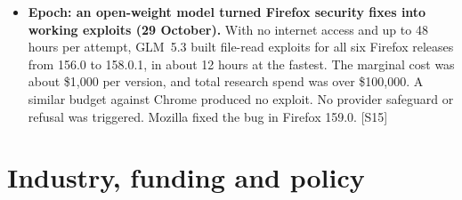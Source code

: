 \documentclass[11pt,a4paper]{article}
\newcommand{\srcref}[1]{\textcolor{brandaccent}{[S#1]}}
\begin{document}
\begin{itemize}
  \item \textbf{Epoch: an open-weight model turned Firefox security fixes into working exploits (29 October).} With no internet access and up to 48 hours per attempt, GLM~5.3 built file-read exploits for all six Firefox releases from 156.0 to 158.0.1, in about 12 hours at the fastest.
  The marginal cost was about \$1,000 per version, and total research spend was over \$100,000. A similar budget against Chrome produced no exploit. No provider safeguard or refusal was triggered. Mozilla fixed the bug in Firefox 159.0. \srcref{15}
\end{itemize}

\section{Industry, funding and policy}
\end{document}
